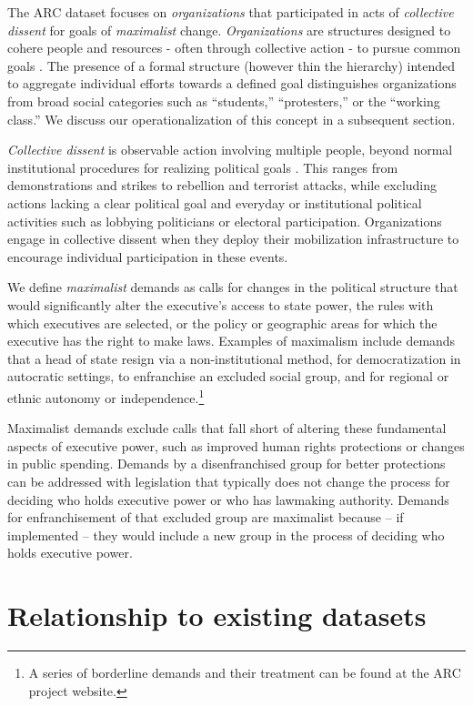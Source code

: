 The ARC dataset focuses on \emph{organizations} that participated in acts of
\emph{collective dissent} for goals of \emph{maximalist} change.
\textit{Organizations} are structures designed to cohere people and resources -
often through collective action - to pursue common goals \citep[2]{North1990,
Daft1992}. The presence of a formal structure (however thin the hierarchy)
intended to aggregate individual efforts towards a defined goal distinguishes
organizations from broad social categories such as ``students,'' ``protesters,''
or the ``working class.'' We discuss our operationalization of this concept in a
subsequent section.    

\emph{Collective dissent} is observable action involving multiple people, beyond
normal institutional procedures for realizing political goals \citep{Tilly1978}.
This ranges from demonstrations and strikes to rebellion and terrorist attacks,
while excluding actions lacking a clear political goal and everyday or
institutional political activities such as lobbying politicians or electoral
participation. Organizations engage in collective dissent when they deploy their
mobilization infrastructure to encourage individual participation in these
events.  

We define \emph{maximalist} demands as calls for changes in the political
structure that would significantly alter the executive's access to state power,
the rules with which executives are selected, or the policy or geographic areas
for which the executive has the right to make laws. Examples of maximalism
include demands that a head of state resign via a non-institutional method, for
democratization in autocratic settings, to enfranchise an excluded social group,
and for regional or ethnic autonomy or independence.\footnote{A series of
borderline demands and their treatment can be found at the ARC project website.}

Maximalist demands exclude calls that fall short of altering these fundamental
aspects of executive power, such as improved human rights protections or changes
in public spending. Demands by a disenfranchised group for better protections
can be addressed with legislation that typically does not change the process for
deciding who holds executive power or who has lawmaking authority. Demands for
enfranchisement of that excluded group are maximalist because -- if implemented
-- they would include a new group in the process of deciding who holds executive
power. 


\section{Relationship to existing datasets}

